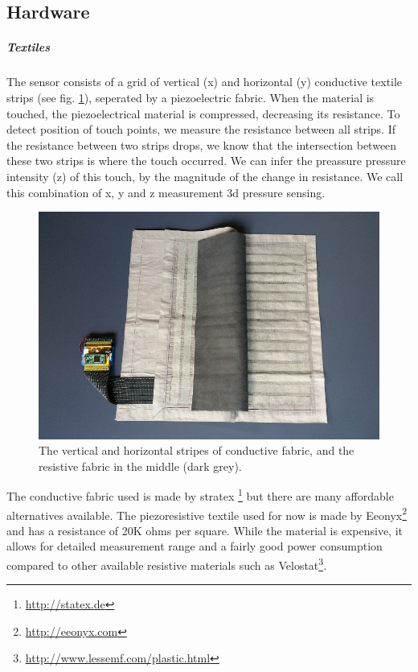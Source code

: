 \documentclass{sigchi-ext}
\begin{document}
\subsection{Hardware}
\subparagraph{Textiles}
The sensor consists of a grid of vertical (x) and horizontal (y) conductive textile strips (see fig. \ref{fig:inside}), seperated by a piezoelectric fabric. When the material is touched, the piezoelectrical material is compressed, decreasing its resistance.
To detect position of touch points, we measure the resistance between all strips. If the resistance between two strips drops, we know that the intersection between these two strips is where the touch occurred. We can infer the preassure pressure intensity (z) of this touch, by the magnitude of the change in resistance. We call this combination of x, y and z measurement 3d pressure sensing.

\begin{figure}[h!]
    \centering
    \includegraphics[width=\columnwidth]{figures/inside}
    \caption{The vertical and horizontal stripes of conductive fabric,
    and the resistive fabric in the middle (dark grey).}\label{fig:inside}
\end{figure}

The conductive fabric used is made by stratex \footnote{\url{http://statex.de}} but there are many affordable alternatives available.
The piezoresistive textile used for now is made by Eeonyx\footnote{\url{http://eeonyx.com}} and has a resistance of 20K ohms per square. While the material is expensive, it allows for detailed measurement range and a fairly good power consumption compared to other available resistive materials such as Velostat\footnote{\url{http://www.lessemf.com/plastic.html}}.
\end{document}
